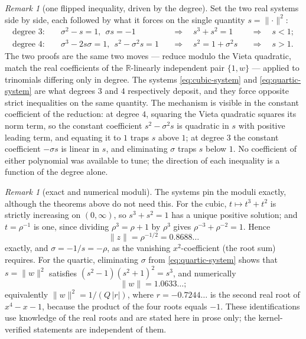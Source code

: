\documentclass[11pt]{amsart}
\theoremstyle{plain}
\theoremstyle{definition}
\theoremstyle{remark}
\newtheorem{remark}[theorem]{Remark}
\begin{document}
\begin{remark}[one flipped inequality, driven by the degree]\label{rem:boundary-mechanism}
Set the two real systems side by side, each followed by what it forces on the single quantity $s = \lVert \cdot \rVert^2$:
\begin{align*}
\text{degree } 3: \quad & \sigma^2 - s = 1, \ \ \sigma s = -1
&&\Longrightarrow \quad s^3 + s^2 = 1
&&\Longrightarrow \quad s < 1 ; \\
\text{degree } 4: \quad & \sigma^3 - 2 s \sigma = 1, \ \ s^2 - \sigma^2 s = 1
&&\Longrightarrow \quad s^2 = 1 + \sigma^2 s
&&\Longrightarrow \quad s > 1 .
\end{align*}
The two proofs are the same two moves --- reduce modulo the Vieta quadratic, match the real coefficients of the $\mathbb{R}$-linearly independent pair $\{1, w\}$ --- applied to trinomials differing only in degree. The systems \eqref{eq:cubic-system} and \eqref{eq:quartic-system} are what degrees $3$ and $4$ respectively deposit, and they force opposite strict inequalities on the same quantity. The mechanism is visible in the constant coefficient of the reduction: at degree $4$, squaring the Vieta quadratic squares its norm term, so the constant coefficient $s^2 - \sigma^2 s$ is quadratic in $s$ with positive leading term, and equating it to $1$ traps $s$ above $1$; at degree $3$ the constant coefficient $-\sigma s$ is linear in $s$, and eliminating $\sigma$ traps $s$ below $1$. No coefficient of either polynomial was available to tune; the direction of each inequality is a function of the degree alone.
\end{remark}

\begin{remark}[exact and numerical moduli]\label{rem:boundary-exact}
The systems pin the moduli exactly, although the theorems above do not need this. For the cubic, $t \mapsto t^3 + t^2$ is strictly increasing on $(0, \infty)$, so $s^3 + s^2 = 1$ has a unique positive solution; and $t = \rho^{-1}$ is one, since dividing $\rho^3 = \rho + 1$ by $\rho^3$ gives $\rho^{-3} + \rho^{-2} = 1$. Hence
\[
\lVert z \rVert = \rho^{-1/2} = 0.8688\ldots
\]
exactly, and $\sigma = -1/s = -\rho$, as the vanishing $x^2$-coefficient (the root sum) requires. For the quartic, eliminating $\sigma$ from \eqref{eq:quartic-system} shows that $s = \lVert w \rVert^2$ satisfies $(s^2 - 1)(s^2 + 1)^2 = s^3$, and numerically
\[
\lVert w \rVert = 1.0633\ldots ;
\]
equivalently $\lVert w \rVert^2 = 1 / (Q\, \lvert r \rvert)$, where $r = -0.7244\ldots$ is the second real root of $x^4 - x - 1$, because the product of the four roots equals $-1$. These identifications use knowledge of the real roots and are stated here in prose only; the kernel-verified statements are independent of them.
\end{remark}
\end{document}
